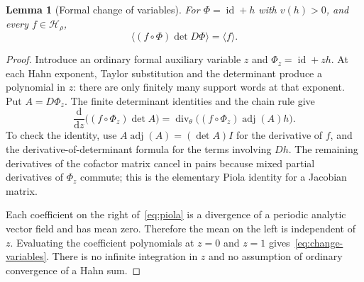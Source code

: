 \documentclass[11pt,letterpaper]{article}
\newtheorem{lemma}[theorem]{Lemma}
\theoremstyle{definition}
\theoremstyle{remark}
\newcommand{\HH}{\mathcal H}
\newcommand{\id}{\operatorname{id}}
\newcommand{\diver}{\operatorname{div}}
\newcommand{\mean}[1]{\langle #1\rangle}
\numberwithin{equation}{section}
\begin{document}
\begin{lemma}[Formal change of variables]\label{lem:change-variables}
For $\Phi=\id+h$ with $v(h)>0$, and every $f\in\HH_\rho$,
\begin{equation}\label{eq:change-variables}
 \mean{(f\circ\Phi)\det D\Phi}=\mean f.
\end{equation}
\end{lemma}
\begin{proof}
Introduce an ordinary formal auxiliary variable $z$ and
$\Phi_z=\id+zh$.  At each Hahn exponent, Taylor substitution and the
determinant produce a polynomial in $z$: there are only finitely many
support words at that exponent.  Put $A=D\Phi_z$.  The finite determinant
identities and the chain rule give
\begin{equation}\label{eq:piola}
 \frac{\mathrm d}{\mathrm dz}
       \bigl((f\circ\Phi_z)\det A\bigr)
 =\diver_\theta\bigl((f\circ\Phi_z)\operatorname{adj}(A)h\bigr).
\end{equation}
To check the identity, use $A\operatorname{adj}(A)=(\det A)I$ for the
derivative of $f$, and the derivative-of-determinant formula for the terms
involving $Dh$.  The remaining derivatives of the cofactor matrix cancel
in pairs because mixed partial derivatives of $\Phi_z$ commute; this is
the elementary Piola identity for a Jacobian matrix.

Each coefficient on the right of~\eqref{eq:piola} is a divergence of a
periodic analytic vector field and has mean zero.  Therefore the mean on
the left is independent of $z$.  Evaluating the coefficient polynomials at
$z=0$ and $z=1$ gives~\eqref{eq:change-variables}.  There is no infinite
integration in $z$ and no assumption of ordinary convergence of a Hahn sum.
\end{proof}
\end{document}
